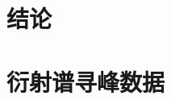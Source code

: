 \documentclass{thuemp}
\begin{document}
\section{结论}



\renewcommand\refname{\heiti\wuhao\centerline{参考文献}\global\def\refname{参考文献}}
\vskip 12pt


\let\OLDthebibliography\thebibliography
\renewcommand\thebibliography[1]{
  \OLDthebibliography{#1}
  \setlength{\parskip}{0pt}
  \setlength{\itemsep}{0pt plus 0.3ex}
}

{
\renewcommand{\baselinestretch}{0.9}
\liuhao


}

\appendix
\section{衍射谱寻峰数据}
\end{document}
